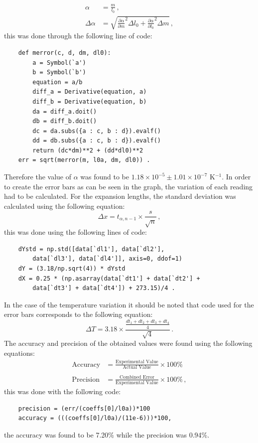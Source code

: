 \documentclass[12pt, a4paper]{article}
\begin{document}
\begin{align*}
    \alpha &= \frac{m}{l_0}\,,\\
    \Delta\alpha &= \sqrt{{\frac{\partial \alpha}{\partial m}}^2\Delta l_0 + {\frac{\partial \alpha}{\partial l_0}}^2 \Delta m}\,,
\end{align*}
this was done through the following line of code:
\begin{lstlisting}
    def merror(c, d, dm, dl0):
        a = Symbol(`a')
        b = Symbol(`b')
        equation = a/b
        diff_a = Derivative(equation, a)
        diff_b = Derivative(equation, b)
        da = diff_a.doit()
        db = diff_b.doit()
        dc = da.subs({a : c, b : d}).evalf()
        dd = db.subs({a : c, b : d}).evalf()
        return (dc*dm)**2 + (dd*dl0)**2
    err = sqrt(merror(m, l0a, dm, dl0)) .
\end{lstlisting}
Therefore the value of $\alpha$ was found to be $1.18\times10^{-5}\pm1.01\times10^{-7}$ K$^{-1}$. In order to create the error bars as can be seen in the graph, the variation of each reading had to be calculated. For the expansion lengths, the standard deviation was calculated using the following equation:
\begin{equation*}
    \Delta x = t_{\alpha,n-1} \times \frac{s}{\sqrt{n}}\,,
\end{equation*}
this was done using the following lines of code:
\begin{lstlisting}
    dYstd = np.std([data[`dl1'], data[`dl2'], 
        data[`dl3'], data[`dl4']], axis=0, ddof=1) 
    dY = (3.18/np.sqrt(4)) * dYstd
    dX = 0.25 * (np.asarray(data[`dt1'] + data[`dt2'] + 
        data[`dt3'] + data[`dt4']) + 273.15)/4 .
\end{lstlisting}
In the case of the temperature variation it should be noted that code used for the error bars corresponds to the following equation:
\begin{equation*}
    \Delta T = 3.18 \times \frac{\frac{dt_1 + dt_2 + dt_3 + dt_4}{4}}{\sqrt{4}}\,.
\end{equation*}
The accuracy and precision of the obtained values were found using the following equations:
\begin{align*}
    \text{Accuracy} &= \frac{\text{Experimental Value}}{\text{Actual Value}} \times 100\% \\
    \\
    \text{Precision}&=\frac{\text{Combined Error}}{\text{Experimental Value}} \times 100\% \,,
\end{align*}
this was done with the following code:
\begin{lstlisting}
    precision = (err/(coeffs[0]/l0a))*100
    accuracy = (((coeffs[0]/l0a)/(11e-6)))*100,
\end{lstlisting}
the accuracy was found to be 7.20\% while the precision was 0.94\%.
\end{document}
